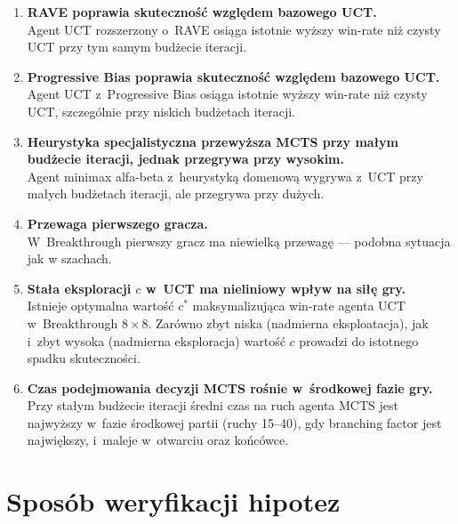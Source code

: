 \documentclass[12pt,a4paper]{article}
\begin{document}
\begin{enumerate}[label=\textbf{H\arabic*.}, leftmargin=3em, itemsep=0.6em]

  \item \textbf{RAVE poprawia skuteczność względem bazowego UCT.}\\
  Agent UCT rozszerzony o~RAVE osiąga istotnie wyższy win-rate niż czysty UCT przy tym samym budżecie iteracji.

  \item \textbf{Progressive Bias poprawia skuteczność względem bazowego UCT.}\\
  Agent UCT z~Progressive Bias osiąga istotnie wyższy win-rate niż czysty UCT, szczególnie przy niskich budżetach iteracji.

  \item \textbf{Heurystyka specjalistyczna przewyższa MCTS przy małym budżecie iteracji, jednak przegrywa przy wysokim.}\\
  Agent minimax alfa-beta z~heurystyką domenową wygrywa z~UCT przy małych budżetach iteracji, ale przegrywa przy dużych.

  \item \textbf{Przewaga pierwszego gracza.}\\
  W~Breakthrough pierwszy gracz ma niewielką przewagę --- podobna sytuacja jak w szachach.
  
  \item \textbf{Stała eksploracji $c$ w~UCT ma nieliniowy wpływ na siłę gry.}\\
  Istnieje optymalna wartość $c^{*}$ maksymalizująca win-rate agenta UCT w~Breakthrough $8\times8$. Zarówno zbyt niska (nadmierna eksploatacja), jak i~zbyt wysoka (nadmierna eksploracja) wartość $c$ prowadzi do istotnego spadku skuteczności.

  \item \textbf{Czas podejmowania decyzji MCTS rośnie w~środkowej fazie gry.}\\
  Przy stałym budżecie iteracji średni czas na ruch agenta MCTS jest najwyższy w~fazie środkowej partii (ruchy 15--40), gdy branching factor jest największy, i~maleje w~otwarciu oraz końcówce.

\end{enumerate}

\section{Sposób weryfikacji hipotez}
\end{document}
